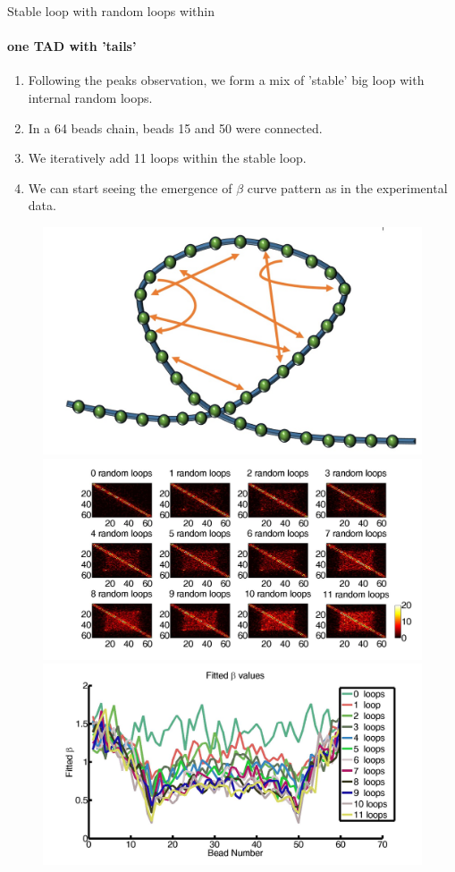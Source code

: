 \documentclass[8pt]{beamer}
\begin{document}
\begin{frame}{Stable loop with random loops within}
\framesubtitle{one TAD with 'tails'}
\begin{enumerate}
\item Following the peaks observation, we form a mix of 'stable' big loop with internal random loops.
\item In a 64 beads chain, beads 15 and 50 were connected.
\item We iteratively add 11 loops within the stable loop.
\item We can start seeing the emergence of $\beta$ curve pattern as in the experimental data.
\end{enumerate}
\begin{figure}[H]
\includegraphics[scale=0.06]{polymerModelWithLoopAndInternalConnectors}
\includegraphics[scale=0.08]{encounterHistogram_randomInternalLoops64BeadChain}
\includegraphics[scale=0.08]{fittedExpOneTADWithTails64Beads1To11Loops}
\end{figure}
\end{frame}
\end{document}
